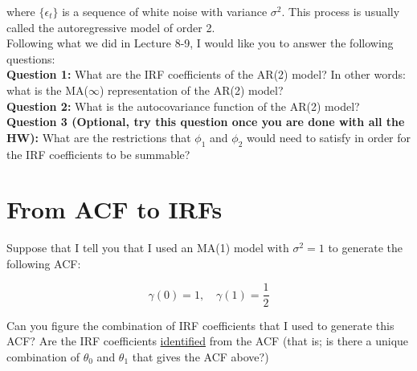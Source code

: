 \documentclass[12] {article}
\begin{document}
\noindent where $\{\epsilon_{t}\}$ is a sequence of white noise with variance $\sigma^2$. This process is usually called the autoregressive model of order 2.\\ 

Following what we did in Lecture 8-9, I would like you to answer the following questions: \\


\noindent \textbf{Question 1:} What are the IRF coefficients of the AR(2) model? In other words: what is the MA($\infty$) representation of the AR(2) model? \\



\noindent \textbf{Question 2:} What is the autocovariance function of the AR(2) model? \\
 
\noindent \textbf{Question 3 (Optional, try this question once you are done with all the HW):} What are the restrictions that $\phi_1$ and $\phi_2$ would need to satisfy in order for the IRF coefficients to be summable?
 
 
\section{From ACF to IRFs}

Suppose that I tell you that I used an MA(1) model with $\sigma^2=1$ to generate the following ACF:

\[ \gamma(0)=1, \quad \gamma(1)= \frac{1}{2} \]

Can you figure the combination of IRF coefficients that I used to generate this ACF? Are the IRF coefficients \underline{identified} from the ACF (that is; is there a unique combination of $\theta_0$ and $\theta_1$ that gives the ACF above?)
\end{document}

